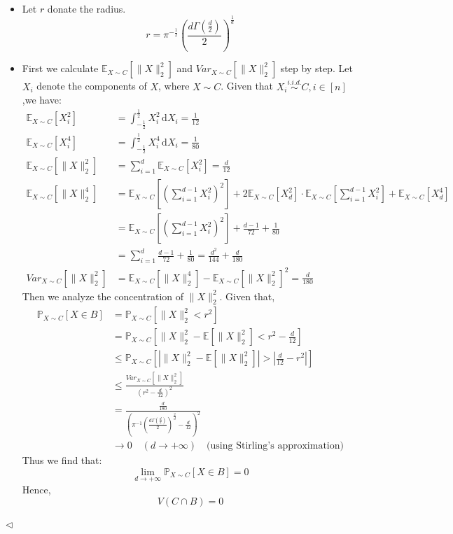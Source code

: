 \documentclass[11pt]{article}
\newenvironment{answer}[1][Answer]{\begin{trivlist}
\item[\hskip \labelsep {\bfseries #1.}\hskip \labelsep]}{\hfill$\lhd$\end{trivlist}}
\begin{document}
\begin{answer} ~
\begin{itemize}
    \item [(1)]
Let $r$ donate the radius.
$$r = \pi^{-\frac{1}{2}}\left(\frac{d\Gamma \left(\frac{d}{2}\right)}{2}\right)^{\frac{1}{d}}$$
    \item [(2)]
First we calculate $\mathbb{E}_{X\sim C}[\|X\|_2^2]$ and $Var_{X\sim C}[\|X\|_2^2]$ step by step.
Let $ X_i $ denote the components of $ X $, where $ X \sim C $. Given that $
X_i \stackrel{i.i.d.}{\sim} C, i \in [n] $,we have:
\[
\begin{align*}
\mathbb{E}_{X \sim C}\left[X_i^2\right] &= \int_{-\frac{1}{2}}^{\frac{1}{2}} X_i^2 \, \mathrm{d}X_i = \frac{1}{12} \\
\mathbb{E}_{X \sim C}\left[X_i^4\right] &= \int_{-\frac{1}{2}}^{\frac{1}{2}} X_i^4 \, \mathrm{d}X_i = \frac{1}{80} \\
\mathbb{E}_{X \sim C}\left[\|X\|_2^2\right] &= \sum_{i=1}^d \mathbb{E}_{X \sim C}\left[X_i^2\right] = \frac{d}{12} \\
\mathbb{E}_{X \sim C}\left[\|X\|_2^4\right] &= \mathbb{E}_{X \sim C}\left[\left(\sum_{i=1}^{d-1}X_i^2\right)^2\right] + 2 \mathbb{E}_{X \sim C}\left[X_d^2\right] \cdot \mathbb{E}_{X \sim C}\left[\sum_{i=1}^{d-1}X_i^2\right] + \mathbb{E}_{X \sim C}\left[X_d^4\right]\\
&= \mathbb{E}_{X \sim C}\left[\left(\sum_{i=1}^{d-1}X_i^2\right)^2\right] + \frac{d-1}{72}+\frac{1}{80}\\
&=\sum_{i=1}^d \frac{d-1}{72}+\frac{1}{80} =\frac{d^2}{144}+\frac{d}{180}\\
Var_{X\sim C}[\|X\|_2^2]&=\mathbb{E}_{X \sim C}\left[\|X\|_2^4\right] - \mathbb{E}_{X \sim C}\left[\|X\|_2^2\right]^2 = \frac{d}{180}
\end{align*}
\]
Then we analyze the concentration of $\|X\|_2^2$.
Given that,
$$
\begin{align*}
\mathbb{P}_{X\sim C} [X\in B] &= \mathbb{P}_{X\sim C} \left[\|X\|_2^2<r^2\right]\\
&= \mathbb{P}_{X\sim C} \left[\|X\|_2^2- \mathbb{E}\left[\|X\|_2^2\right]<r^2-\frac{d}{12}\right]\\
&\leq \mathbb{P}_{X\sim C} \left[\left|\|X\|_2^2- \mathbb{E}\left[\|X\|_2^2\right]\right|>|\frac{d}{12}-r^2|\right]\\
&\leq \frac{Var_{X\sim C}[\|X\|_2^2]}{\left(r^2-\frac{d}{12} \right)^2}\\
&=\frac{\frac{d}{180}}{\left(\pi^{-1}\left(\frac{d\Gamma \left(\frac{d}{2}\right)}{2}\right)^{\frac{2}{d}}-\frac{d}{12} \right)^2}\\
&\rightarrow 0 \quad (d \rightarrow +\infty) \quad \text{(using Stirling's approximation)}
\end{align*}
$$
Thus we find that:
$$\lim_{d\rightarrow +\infty} \mathbb{P}_{X\sim C} [X\in B] =0$$
 Hence,
$$V(C\cap B)=0$$
\end{itemize}
\end{answer}
\end{document}
